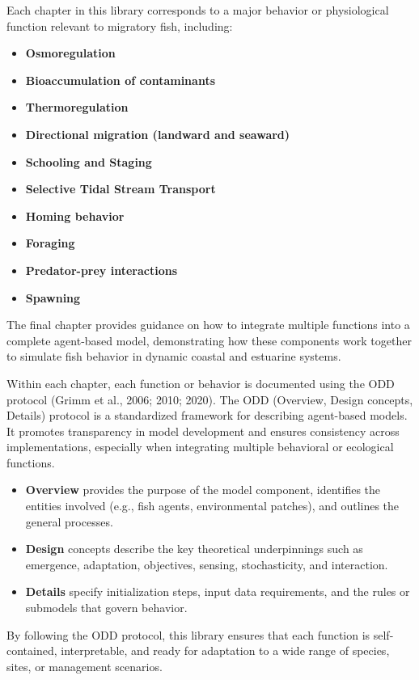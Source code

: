 \documentclass[
]{book}
\begin{document}
Each chapter in this library corresponds to a major behavior or physiological function relevant to migratory fish, including:

\begin{itemize}
\item
  \textbf{Osmoregulation}
\item
  \textbf{Bioaccumulation of contaminants}
\item
  \textbf{Thermoregulation}
\item
  \textbf{Directional migration (landward and seaward)}
\item
  \textbf{Schooling and Staging}
\item
  \textbf{Selective Tidal Stream Transport}
\item
  \textbf{Homing behavior}
\item
  \textbf{Foraging}
\item
  \textbf{Predator-prey interactions}
\item
  \textbf{Spawning}
\end{itemize}

The final chapter provides guidance on how to integrate multiple functions into a complete agent-based model, demonstrating how these components work together to simulate fish behavior in dynamic coastal and estuarine systems.

Within each chapter, each function or behavior is documented using the ODD protocol (Grimm et al., 2006; 2010; 2020). The ODD (Overview, Design concepts, Details) protocol is a standardized framework for describing agent-based models. It promotes transparency in model development and ensures consistency across implementations, especially when integrating multiple behavioral or ecological functions.

\begin{itemize}
\item
  \textbf{Overview} provides the purpose of the model component, identifies the entities involved (e.g., fish agents, environmental patches), and outlines the general processes.
\item
  \textbf{Design} concepts describe the key theoretical underpinnings such as emergence, adaptation, objectives, sensing, stochasticity, and interaction.
\item
  \textbf{Details} specify initialization steps, input data requirements, and the rules or submodels that govern behavior.
\end{itemize}

By following the ODD protocol, this library ensures that each function is self-contained, interpretable, and ready for adaptation to a wide range of species, sites, or management scenarios.
\end{document}
